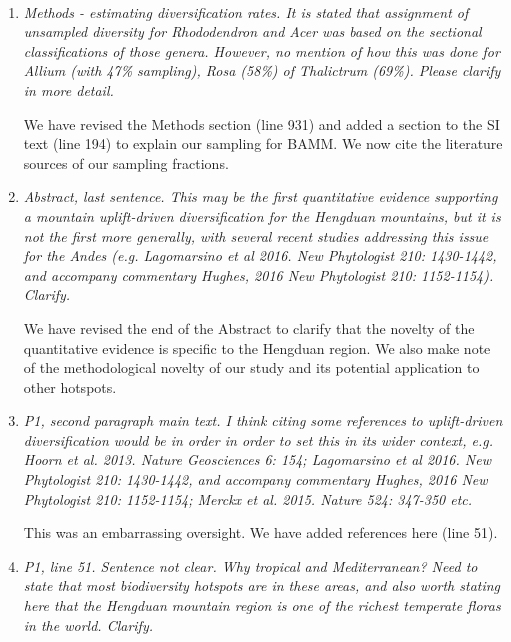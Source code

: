 \documentclass[11pt]{letter}
\begin{document}
\begin{letter}{ \\

}
\begin{enumerate}
  More generally, since the BAMM results are largely uninformative
  with respect to the goals of our study, and (as we argue in the
  text) the method is not very well-suited to the data (due to the
  general scarcity of endemic radiations), we do not feel it necessary
  to call attention to the Moore et al.\ controversy in the main text.

\item \textit{Methods - estimating diversification rates. It is stated
    that assignment of unsampled diversity for Rhododendron and Acer
    was based on the sectional classifications of those
    genera. However, no mention of how this was done for Allium (with
    47\% sampling), Rosa (58\%) of Thalictrum (69\%). Please clarify
    in more detail.}

  We have revised the Methods section (line 931) and added a section
  to the SI text (line 194) to explain our sampling for BAMM. We now
  cite the literature sources of our sampling fractions.

\item \textit{Abstract, last sentence. This may be the first
    quantitative evidence supporting a mountain uplift-driven
    diversification for the Hengduan mountains, but it is not the
    first more generally, with several recent studies addressing this
    issue for the Andes (e.g. Lagomarsino et al 2016. New Phytologist
    210: 1430-1442, and accompany commentary Hughes, 2016 New
    Phytologist 210: 1152-1154). Clarify.}

  We have revised the end of the Abstract to clarify that the novelty
  of the quantitative evidence is specific to the Hengduan region. We
  also make note of the methodological novelty of our study and its
  potential application to other hotspots.

\item \textit{P1, second paragraph main text. I think citing some
    references to uplift-driven diversification would be in order in
    order to set this in its wider context, e.g. Hoorn et
    al. 2013. Nature Geosciences 6: 154; Lagomarsino et al 2016. New
    Phytologist 210: 1430-1442, and accompany commentary Hughes, 2016
    New Phytologist 210: 1152-1154; Merckx et al. 2015. Nature 524:
    347-350 etc.}

  This was an embarrassing oversight. We have added references here
  (line 51).

\item \textit{P1, line 51. Sentence not clear. Why tropical and
    Mediterranean? Need to state that most biodiversity hotspots are
    in these areas, and also worth stating here that the Hengduan
    mountain region is one of the richest temperate floras in the
    world. Clarify.}


\end{enumerate}
\end{letter}
\end{document}
